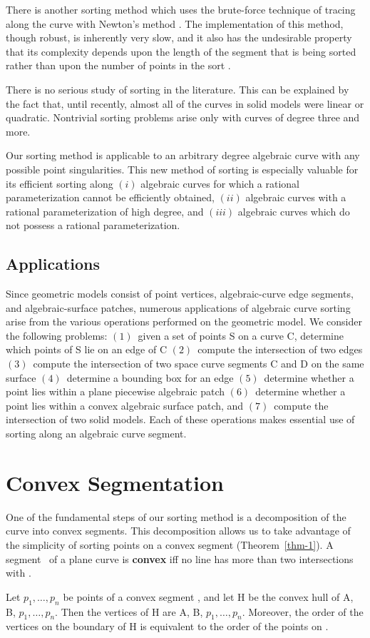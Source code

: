 There is another sorting method which uses the brute-force technique of
tracing along the curve with Newton's method \cite{bhh}.
The implementation of this method, though robust, is inherently very slow,
and it also has the undesirable property
that its complexity depends upon the length of the segment that is being
sorted rather than upon the number of points in the sort  \cite{john}.

There is no serious study of sorting in the literature.
This can be explained by the fact that,
until recently, almost all of the curves in solid models were
linear or quadratic.
Nontrivial sorting problems arise only with curves of degree 
three and more.

Our sorting method is applicable to an arbitrary degree algebraic curve 
with any possible point singularities.
This new method of sorting is especially valuable for its efficient sorting 
along 
$(i)$ algebraic curves for which a rational parameterization cannot be efficiently obtained, 
$(ii)$ algebraic curves with a rational parameterization of high degree, 
and $(iii)$ algebraic curves which do not possess a rational
parameterization.
%
\subsection{Applications}
\tab Since geometric models consist of point vertices, algebraic-curve edge segments,
and algebraic-surface patches, numerous applications of algebraic curve sorting
arise from the various operations performed on the geometric model.
We consider the following problems:
$(1)$~given a set of points S on a curve C, determine which points of S lie on
an edge of C
$(2)$~compute the intersection of two edges
$(3)$~compute the intersection of two space curve segments C and D on the same surface
$(4)$~determine a bounding box for an edge
$(5)$~determine whether a point lies within a plane piecewise algebraic patch
$(6)$~determine whether a point lies within a convex algebraic surface patch, and
$(7)$~compute the intersection of two solid models.
Each of these operations makes essential use of sorting along an algebraic curve
segment.
%
\section{Convex Segmentation}

\tab One of the fundamental steps of our sorting method is a decomposition of the 
curve into convex segments.
This decomposition allows us to take advantage of the simplicity of sorting
points on a convex segment (Theorem~\ref{thm-1}).
%
A segment \ of a plane curve is {\bf convex} iff
no line has more than 
two intersections with .
%
\begin{theorem}
\label{thm-1}
Let $p_{1},\ldots,p_{n}$ be points of a convex segment , 
and let H be the convex hull of A, B, $p_{1},\ldots,p_{n}$.
Then the vertices of H are A, B, $p_{1},\ldots,p_{n}$.
Moreover, the order of the vertices on the boundary of H is equivalent
to the order of the points on .
\end{theorem}
%

